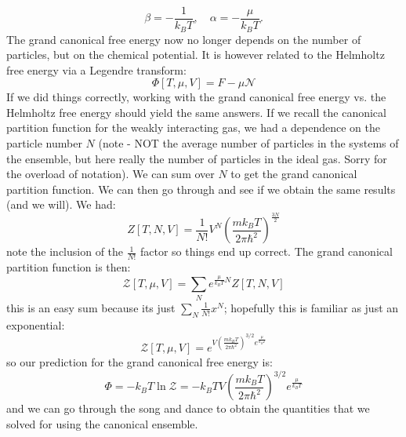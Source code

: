 \begin{equation}
    \beta = -\frac{1}{k_B T}, \quad \alpha = -\frac{\mu}{k_B T}.
\end{equation}
The grand canonical free energy now no longer depends on the number of particles, but on the chemical potential. It is however related to the Helmholtz free energy via a Legendre transform:
\begin{equation}
    \Phi[T, \mu, V] = F - \mu \mathcal{N}
\end{equation}
If we did things correctly, working with the grand canonical free energy vs. the Helmholtz free energy should yield the same answers. If we recall the canonical partition function for the weakly interacting gas, we had a dependence on the particle number $N$ (note - NOT the average number of particles in the systems of the ensemble, but here really the number of particles in the ideal gas. Sorry for the overload of notation). We can sum over $N$ to get the grand canonical partition function. We can then go through and see if we obtain the same results (and we will). We had:
\begin{equation}
    Z[T, N, V] = \frac{1}{N!}V^N\left(\frac{mk_B T}{2\pi \hbar^2}\right)^{\frac{3N}{2}}
\end{equation}
note the inclusion of the $\frac{1}{N!}$ factor so things end up correct. The grand canonical partition function is then:
\begin{equation}
    \mathcal{Z}[T, \mu, V] = \sum_N e^{\frac{\mu}{k_B T}N}Z[T, N, V]
\end{equation}
this is an easy sum because its just $\sum_N \frac{1}{N!}x^N$; hopefully this is familiar as just an exponential:
\begin{equation}
    \mathcal{Z}[T, \mu, V] = e^{V\left(\frac{mk_B T}{2\pi \hbar^2}\right)^{3/2}e^{\frac{\mu}{k_B T}}}
\end{equation}
so our prediction for the grand canonical free energy is:
\begin{equation}
    \Phi = -k_B T \ln \mathcal{Z} = -k_B TV\left(\frac{mk_B T}{2\pi \hbar^2}\right)^{3/2}e^{\frac{\mu}{k_B T}}
\end{equation}
and we can go through the song and dance to obtain the quantities that we solved for using the canonical ensemble.